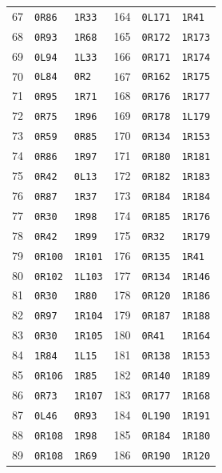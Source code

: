 \begin{longtable}{@{}rll@{\qquad\qquad}rll@{}}
67 & \texttt{0R86} & \texttt{1R33} & 164 & \texttt{0L171} & \texttt{1R41}\\
68 & \texttt{0R93} & \texttt{1R68} & 165 & \texttt{0R172} & \texttt{1R173}\\
69 & \texttt{0L94} & \texttt{1L33} & 166 & \texttt{0R171} & \texttt{1R174}\\
70 & \texttt{0L84} & \texttt{0R2} & 167 & \texttt{0R162} & \texttt{1R175}\\
71 & \texttt{0R95} & \texttt{1R71} & 168 & \texttt{0R176} & \texttt{1R177}\\
72 & \texttt{0R75} & \texttt{1R96} & 169 & \texttt{0R178} & \texttt{1L179}\\
73 & \texttt{0R59} & \texttt{0R85} & 170 & \texttt{0R134} & \texttt{1R153}\\
74 & \texttt{0R86} & \texttt{1R97} & 171 & \texttt{0R180} & \texttt{1R181}\\
75 & \texttt{0R42} & \texttt{0L13} & 172 & \texttt{0R182} & \texttt{1R183}\\
76 & \texttt{0R87} & \texttt{1R37} & 173 & \texttt{0R184} & \texttt{1R184}\\
77 & \texttt{0R30} & \texttt{1R98} & 174 & \texttt{0R185} & \texttt{1R176}\\
78 & \texttt{0R42} & \texttt{1R99} & 175 & \texttt{0R32} & \texttt{1R179}\\
79 & \texttt{0R100} & \texttt{1R101} & 176 & \texttt{0R135} & \texttt{1R41}\\
80 & \texttt{0R102} & \texttt{1L103} & 177 & \texttt{0R134} & \texttt{1R146}\\
81 & \texttt{0R30} & \texttt{1R80} & 178 & \texttt{0R120} & \texttt{1R186}\\
82 & \texttt{0R97} & \texttt{1R104} & 179 & \texttt{0R187} & \texttt{1R188}\\
83 & \texttt{0R30} & \texttt{1R105} & 180 & \texttt{0R41} & \texttt{1R164}\\
84 & \texttt{1R84} & \texttt{1L15} & 181 & \texttt{0R138} & \texttt{1R153}\\
85 & \texttt{0R106} & \texttt{1R85} & 182 & \texttt{0R140} & \texttt{1R189}\\
86 & \texttt{0R73} & \texttt{1R107} & 183 & \texttt{0R177} & \texttt{1R168}\\
87 & \texttt{0L46} & \texttt{0R93} & 184 & \texttt{0L190} & \texttt{1R191}\\
88 & \texttt{0R108} & \texttt{1R98} & 185 & \texttt{0R184} & \texttt{1R180}\\
89 & \texttt{0R108} & \texttt{1R69} & 186 & \texttt{0R190} & \texttt{1R120}\\

\end{longtable}
